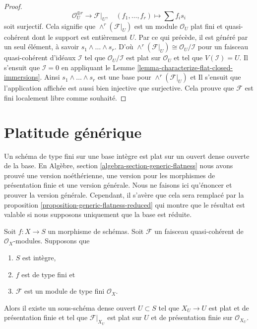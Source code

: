 \begin{proof}
$$
\mathcal{O}_U^{\oplus r} \longrightarrow \mathcal{F}|_U, \quad
(f_1, \ldots, f_r) \longmapsto \sum f_i s_i
$$
soit surjectif. Cela signifie
que $\wedge^r(\mathcal{F}|_U)$ est un module $\mathcal{O}_U$
plat fini et quasi-cohérent dont le
support est entièrement $U$. Par ce
qui précède, il est généré
par un seul élément, à savoir $s_1 \wedge \ldots \wedge s_r$. D'où
$\wedge^r(\mathcal{F}|_U) \cong \mathcal{O}_U/\mathcal{I}$ pour un faisceau quasi-cohérent
d'idéaux $\mathcal{I}$ tel que $\mathcal{O}_U/\mathcal{I}$ est plat
sur $\mathcal{O}_U$ et tel
que $V(\mathcal{I}) = U$. Il s'ensuit que
$\mathcal{I} = 0$ en appliquant le Lemme \ref{lemma-characterize-flat-closed-immersions}.
Ainsi $s_1 \wedge \ldots \wedge s_r$ est une base pour
$\wedge^r(\mathcal{F}|_U)$ et Il s'ensuit que l'application affichée est aussi bien injective
que surjective. Cela prouve que $\mathcal{F}$ est fini localement libre comme
souhaité.
\end{proof}






\section{Platitude générique}
\label{section-generic-flatness}

\noindent
Un schéma de type fini sur une base intègre est plat sur un ouvert dense
ouverte de la base.
En Algèbre, section \ref{algebra-section-generic-flatness} nous avons prouvé une version
noéthérienne, une version pour les morphismes de présentation finie et une
version générale. Nous ne faisons ici qu’énoncer et prouver la version générale.
Cependant, il s'avère que cela sera remplacé
par la proposition \ref{proposition-generic-flatness-reduced} qui montre que le résultat
est valable si nous supposons uniquement que la base est réduite.

\begin{proposition}
\label{proposition-generic-flatness}
Soit $f : X \to S$ un morphisme de schémas. Soit
$\mathcal{F}$ un faisceau quasi-cohérent de $\mathcal{O}_X$-modules. Supposons
que
\begin{enumerate}
\item $S$ est intègre,
\item $f$ est de type fini et
\item $\mathcal{F}$ est un module de type fini $\mathcal{O}_X$.
\end{enumerate}
Alors il existe un sous-schéma dense ouvert $U \subset S$ tel que
$X_U \to U$ est plat et de présentation finie et tel
que $\mathcal{F}|_{X_U}$ est plat sur $U$ et de présentation
finie sur $\mathcal{O}_{X_U}$.
\end{proposition}

